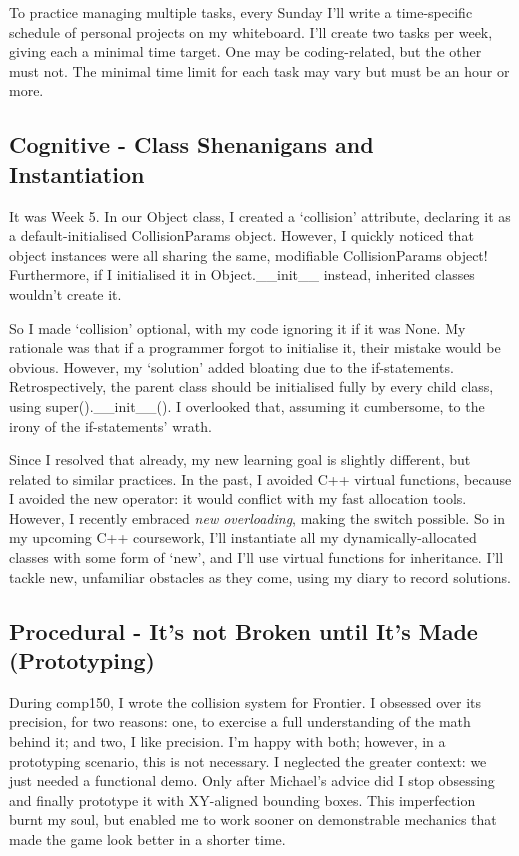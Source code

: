 \documentclass{scrartcl}
\begin{document}
To practice managing multiple tasks, every Sunday I'll write a time-specific schedule of personal projects on my whiteboard. I'll create two tasks per week, giving each a minimal time target. One may be coding-related, but the other must not. The minimal time limit for each task may vary but must be an hour or more.

\subsection{Cognitive - Class Shenanigans and Instantiation} %

It was Week 5. In our Object class, I created a `collision' attribute, declaring it as a default-initialised CollisionParams object. However, I quickly noticed that object instances were all sharing the same, modifiable CollisionParams object! Furthermore, if I initialised it in Object.\_\_init\_\_ instead, inherited classes wouldn't create it.

So I made `collision' optional, with my code ignoring it if it was None. My rationale was that if a programmer forgot to initialise it, their mistake would be obvious. However, my `solution' added bloating due to the if-statements. Retrospectively, the parent class should be initialised fully by every child class, using super().\_\_init\_\_(). I overlooked that, assuming it cumbersome, to the irony of the if-statements' wrath.

Since I resolved that already, my new learning goal is slightly different, but related to similar practices. In the past, I avoided C++ virtual functions, because I avoided the new operator: it would conflict with my fast allocation tools. However, I recently embraced \textit{new overloading}, making the switch possible. So in my upcoming C++ coursework, I'll instantiate all my dynamically-allocated classes with some form of `new', and I'll use virtual functions for inheritance. I'll tackle new, unfamiliar obstacles as they come, using my diary to record solutions.

\subsection{Procedural - It's not Broken until It's Made (Prototyping)} %

During comp150, I wrote the collision system for Frontier. I obsessed over its precision, for two reasons: one, to exercise a full understanding of the math behind it; and two, I like precision. I'm happy with both; however, in a prototyping scenario, this is not necessary. I neglected the greater context: we just needed a functional demo. Only after Michael's advice did I stop obsessing and finally prototype it with XY-aligned bounding boxes. This imperfection burnt my soul, but enabled me to work sooner on demonstrable mechanics that made the game look better in a shorter time. 
\end{document}
